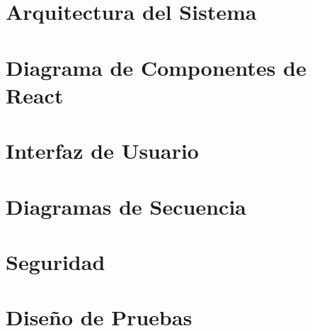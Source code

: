 \section{Arquitectura del Sistema}

\section{Diagrama de Componentes de React}

\section{Interfaz de Usuario}

\section{Diagramas de Secuencia}

\section{Seguridad}

\section{Diseño de Pruebas}
